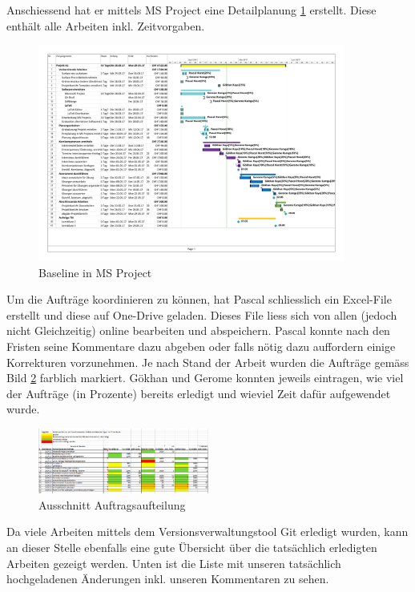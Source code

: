 Anschiessend hat er mittels MS Project eine Detailplanung \ref{fig:msproject} erstellt. Diese enthält alle Arbeiten inkl. Zeitvorgaben.

\begin{figure}[ht]
	\centering
	\includegraphics[width=0.9\textwidth]{images/BaselineAC2.pdf}
	\caption{Baseline in MS Project}
	\label{fig:msproject}
\end{figure}

Um die Aufträge koordinieren zu können, hat Pascal schliesslich ein Excel-File erstellt und diese auf One-Drive geladen. Dieses File liess sich von allen (jedoch nicht Gleichzeitig) online bearbeiten und abspeichern. Pascal konnte nach den Fristen seine Kommentare dazu abgeben oder falls nötig dazu auffordern einige Korrekturen vorzunehmen. Je nach Stand der Arbeit wurden die Aufträge gemäss Bild \ref{fig:auftrage} farblich markiert. Gökhan und Gerome konnten jeweils eintragen, wie viel der Aufträge (in Prozente) bereits erledigt und wieviel Zeit dafür aufgewendet wurde. 

\begin{figure}[ht]
	\centering
	\includegraphics[width=0.5\textwidth]{images/Auftrage}
	\caption{Ausschnitt Auftragsaufteilung}
	\label{fig:auftrage}
\end{figure}

Da viele Arbeiten mittels dem Versionsverwaltungstool Git erledigt wurden, kann an dieser Stelle ebenfalls eine gute Übersicht über die tatsächlich erledigten Arbeiten gezeigt werden. Unten ist die Liste mit unseren tatsächlich hochgeladenen Änderungen inkl. unseren Kommentaren zu sehen.

